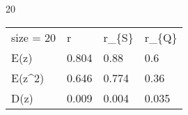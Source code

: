 
20
\begin{tabular}{llll}
\hline
 size = 20 & r     & r\_\{S\} & r\_\{Q\} \\
 E(z)      & 0.804 & 0.88  & 0.6   \\
 E(z\^{}2)    & 0.646 & 0.774 & 0.36  \\
 D(z)      & 0.009 & 0.004 & 0.035 \\
\hline
\end{tabular}